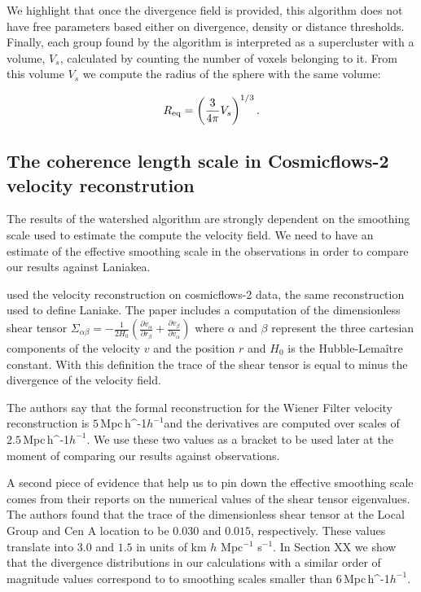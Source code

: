 \documentclass[usenatbib]{mnras}
\newcommand{\Mpch}{\,{\rm Mpc}\,\ifmmode h^{-1}\else $h^{-1}$\fi}
\begin{document}
We highlight that once the divergence field is provided, this algorithm
does not have free parameters based either on divergence, density or distance thresholds. 
Finally, each group found by the algorithm is interpreted as a supercluster 
with a volume, $V_s$, calculated by counting the number of voxels belonging to it.
From this volume $V_s$ we compute the radius of the sphere with the same volume:

\begin{equation}
    R_{\rm eq} = \left(\frac{3}{4\pi}V_{s}\right)^{1/3}.
\end{equation}

\subsection{The coherence length scale in Cosmicflows-2 velocity reconstrution}

The results of the watershed algorithm are strongly dependent on the
smoothing scale used to estimate the compute the velocity field.
We need to have an estimate of the effective smoothing scale in the observations in order to compare our results against Laniakea.

\cite{2015MNRAS.452.1052L} used the velocity reconstruction on cosmicflows-2 data, the same reconstruction used to define Laniake.
The paper includes a computation of the dimensionless shear tensor $\Sigma_{\alpha\beta}=-\frac{1}{2H_0}\left(\frac{\partial v_\alpha}{\partial r_\beta}+\frac{\partial v_\beta}{\partial v_\alpha}\right)$ where $\alpha$ and $\beta$ represent the three cartesian components of the velocity $v$ and the position $r$ and $H_0$ is the Hubble-Lema\^itre constant.
With this definition the trace of the shear tensor is equal to minus the divergence of the velocity field.


The authors say that the formal reconstruction for the Wiener Filter velocity reconstruction is $5$\Mpch and the derivatives are computed over scales of $2.5$\Mpch. 
We use these two values as a bracket to be used later at the moment of comparing our results against observations.

A second piece of evidence that help us to pin down the effective smoothing scale comes from their reports on the numerical values of the shear tensor eigenvalues.
The authors found that the trace of the dimensionless shear tensor at the Local Group and Cen A location to be $0.030$ and $0.015$, respectively. 
These values translate into $3.0$ and $1.5$ in units of km $h$ Mpc$^{-1}$ s$^{-1}$. 
In Section XX we show that the divergence distributions in our calculations with a similar order of magnitude values correspond to 
to smoothing scales smaller than $6$\Mpch.
\end{document}
